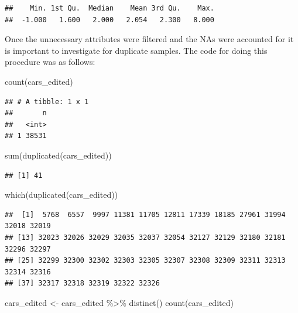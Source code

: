 \documentclass[
]{article}
\newenvironment{Shaded}{\begin{snugshade}}{\end{snugshade}}
\newcommand{\FunctionTok}[1]{\textcolor[rgb]{0.00,0.00,0.00}{#1}}
\newcommand{\NormalTok}[1]{#1}
\newcommand{\OtherTok}[1]{\textcolor[rgb]{0.56,0.35,0.01}{#1}}
\newcommand{\SpecialCharTok}[1]{\textcolor[rgb]{0.00,0.00,0.00}{#1}}
\begin{document}
\begin{verbatim}
##    Min. 1st Qu.  Median    Mean 3rd Qu.    Max. 
##  -1.000   1.600   2.000   2.054   2.300   8.000
\end{verbatim}

Once the unnecessary attributes were filtered and the NAs were accounted
for it is important to investigate for duplicate samples. The code for
doing this procedure was as follows:

\begin{Shaded}
\begin{Highlighting}[]
\FunctionTok{count}\NormalTok{(cars\_edited)}
\end{Highlighting}
\end{Shaded}

\begin{verbatim}
## # A tibble: 1 x 1
##       n
##   <int>
## 1 38531
\end{verbatim}

\begin{Shaded}
\begin{Highlighting}[]
\FunctionTok{sum}\NormalTok{(}\FunctionTok{duplicated}\NormalTok{(cars\_edited))}
\end{Highlighting}
\end{Shaded}

\begin{verbatim}
## [1] 41
\end{verbatim}

\begin{Shaded}
\begin{Highlighting}[]
\FunctionTok{which}\NormalTok{(}\FunctionTok{duplicated}\NormalTok{(cars\_edited))}
\end{Highlighting}
\end{Shaded}

\begin{verbatim}
##  [1]  5768  6557  9997 11381 11705 12811 17339 18185 27961 31994 32018 32019
## [13] 32023 32026 32029 32035 32037 32054 32127 32129 32180 32181 32296 32297
## [25] 32299 32300 32302 32303 32305 32307 32308 32309 32311 32313 32314 32316
## [37] 32317 32318 32319 32322 32326
\end{verbatim}

\begin{Shaded}
\begin{Highlighting}[]
\NormalTok{cars\_edited }\OtherTok{\textless{}{-}}\NormalTok{ cars\_edited }\SpecialCharTok{\%\textgreater{}\%} \FunctionTok{distinct}\NormalTok{()}
\FunctionTok{count}\NormalTok{(cars\_edited)}
\end{Highlighting}
\end{Shaded}
\end{document}
